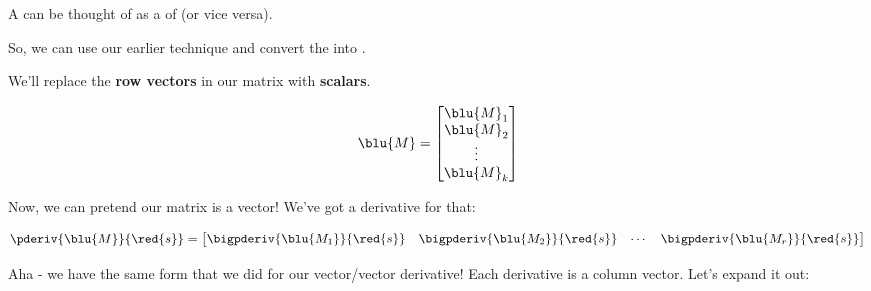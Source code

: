         \begin{concept}
            A  can be thought of as a  of  (or vice versa).
            
            So, we can use our earlier technique and convert the  into .
        \end{concept}
        
        We'll replace the \textbf{row vectors} in our matrix with \textbf{scalars}. 
        
        \begin{equation}
            \blu{M}
            =
            \begin{bmatrix}
                \blu{M}_1 \\ \blu{M}_2 \\ \vdots \\ \blu{M}_k
            \end{bmatrix}
        \end{equation}
    
        Now, we can pretend our matrix is a vector! We've got a derivative for that:
        
        \begin{equation}
            \pderiv{ \blu{M} }{ \red{s} } 
            =
            \begin{bmatrix}
                \bigpderiv{ \blu{M_1} }{ \red{s} } &
                \bigpderiv{ \blu{M_2} }{ \red{s} } &
                \cdots &
                \bigpderiv{ \blu{M_r} }{ \red{s} } 
            \end{bmatrix}
        \end{equation}
        
        Aha - we have the same form that we did for our vector/vector derivative! Each derivative is a column vector. Let's expand it out:
        
